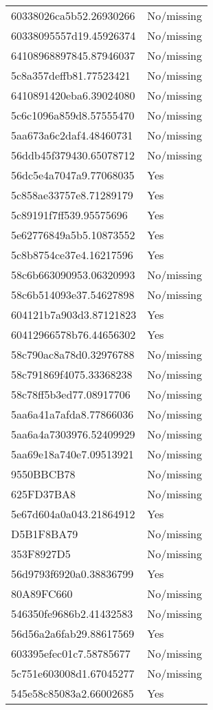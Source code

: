 \begin{tabular}{ll}
60338026ca5b52.26930266 & No/missing \\
60338095557d19.45926374 & No/missing \\
64108968897845.87946037 & No/missing \\
5c8a357deffb81.77523421 & No/missing \\
6410891420eba6.39024080 & No/missing \\
5c6c1096a859d8.57555470 & No/missing \\
5aa673a6c2daf4.48460731 & No/missing \\
56ddb45f379430.65078712 & No/missing \\
56dc5e4a7047a9.77068035 & Yes \\
5c858ae33757e8.71289179 & Yes \\
5c89191f7ff539.95575696 & Yes \\
5e62776849a5b5.10873552 & Yes \\
5c8b8754ce37e4.16217596 & Yes \\
58c6b663090953.06320993 & No/missing \\
58c6b514093e37.54627898 & No/missing \\
604121b7a903d3.87121823 & Yes \\
60412966578b76.44656302 & Yes \\
58c790ac8a78d0.32976788 & No/missing \\
58c791869f4075.33368238 & No/missing \\
58c78ff5b3ed77.08917706 & No/missing \\
5aa6a41a7afda8.77866036 & No/missing \\
5aa6a4a7303976.52409929 & No/missing \\
5aa69e18a740e7.09513921 & No/missing \\
9550BBCB78 & No/missing \\
625FD37BA8 & No/missing \\
5e67d604a0a043.21864912 & Yes \\
D5B1F8BA79 & No/missing \\
353F8927D5 & No/missing \\
56d9793f6920a0.38836799 & Yes \\
80A89FC660 & No/missing \\
546350fe9686b2.41432583 & No/missing \\
56d56a2a6fab29.88617569 & Yes \\
603395efec01c7.58785677 & No/missing \\
5c751e603008d1.67045277 & No/missing \\
545e58c85083a2.66002685 & Yes \\

\end{tabular}
